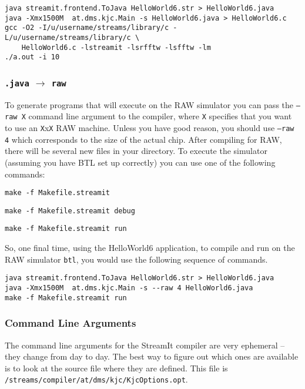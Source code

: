 \begin{verbatim}
java streamit.frontend.ToJava HelloWorld6.str > HelloWorld6.java
java -Xmx1500M  at.dms.kjc.Main -s HelloWorld6.java > HelloWorld6.c
gcc -O2 -I/u/username/streams/library/c -L/u/username/streams/library/c \
    HelloWorld6.c -lstreamit -lsrfftw -lsfftw -lm
./a.out -i 10
\end{verbatim}


\subsubsection{{\tt .java} $\rightarrow$ {\tt raw}}
To generate programs that will execute on the RAW simulator
you can pass the {\tt --raw X} command line argument to the compiler,
where {\tt X} specifies that you want to use an {\tt X}x{\tt X}
RAW machine. Unless you
have good reason, you should use {\tt --raw 4} which
corresponds to the size of the actual chip. After compiling
for RAW, there will be several new files in your directory.
To execute the simulator (assuming you have BTL set up correctly)
you can use one of the following commands:

\begin{verbatim}
make -f Makefile.streamit
\end{verbatim}

\begin{verbatim}
make -f Makefile.streamit debug
\end{verbatim}

\begin{verbatim}
make -f Makefile.streamit run
\end{verbatim}


So, one final time, using the HelloWorld6 application,
to compile and run on the RAW simulator {\tt btl}, 
you would use the following sequence of commands.

\begin{verbatim}
java streamit.frontend.ToJava HelloWorld6.str > HelloWorld6.java
java -Xmx1500M  at.dms.kjc.Main -s --raw 4 HelloWorld6.java
make -f Makefile.streamit run
\end{verbatim}


\subsubsection{Command Line Arguments}
The command line arguments for the StreamIt compiler are
very ephemeral -- they change from day to day. The best way 
to figure out which ones are available is to look at the
source file where they are defined. This file is
{\tt /streams/compiler/at/dms/kjc/KjcOptions.opt}.